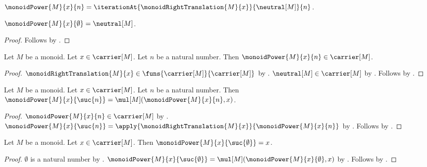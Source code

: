 \begin{definition}\label{monoid_power}
    $\monoidPower{M}{x}{n}=
        \iterationAt{\monoidRightTranslation{M}{x}}{\neutral[M]}{n}$.
\end{definition}

\begin{proposition}\label{monoid_power_zero}
    $\monoidPower{M}{x}{\emptyset}=\neutral[M]$.
\end{proposition}
\begin{proof}
    Follows by .
\end{proof}

\begin{proposition}\label{monoid_power_type}
    Let $M$ be a monoid.
    Let $x\in\carrier[M]$.
    Let $n$ be a natural number.
    Then $\monoidPower{M}{x}{n}\in\carrier[M]$.
\end{proposition}
\begin{proof}
    $\monoidRightTranslation{M}{x}\in
        \funs{\carrier[M]}{\carrier[M]}$ by
        .
    $\neutral[M]\in\carrier[M]$ by
        .
    Follows by .
\end{proof}

\begin{proposition}\label{monoid_power_successor}
    Let $M$ be a monoid.
    Let $x\in\carrier[M]$.
    Let $n$ be a natural number.
    Then $\monoidPower{M}{x}{\suc{n}}=
        \mul[M](\monoidPower{M}{x}{n},x)$.
\end{proposition}
\begin{proof}
    $\monoidPower{M}{x}{n}\in\carrier[M]$ by
        .
    $\monoidPower{M}{x}{\suc{n}}=
        \apply{\monoidRightTranslation{M}{x}}{
            \monoidPower{M}{x}{n}}$ by
        .
    Follows by .
\end{proof}

\begin{proposition}\label{monoid_power_one}
    Let $M$ be a monoid.
    Let $x\in\carrier[M]$.
    Then $\monoidPower{M}{x}{\suc{\emptyset}}=x$.
\end{proposition}
\begin{proof}
    $\emptyset$ is a natural number by .
    $\monoidPower{M}{x}{\suc{\emptyset}}=
        \mul[M](\monoidPower{M}{x}{\emptyset},x)$ by
        .
    Follows by
        .
\end{proof}

